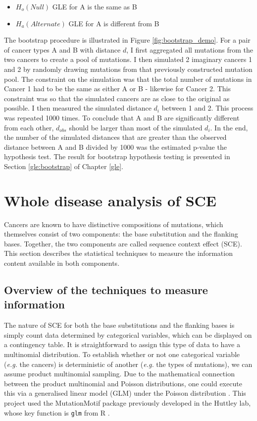 \begin{itemize}
    \item $H_o (Null)$ GLE for A is the same as B
    \item $H_a (Alternate)$ GLE for A is different from B
\end{itemize}

The bootstrap procedure is illustrated in Figure \ref{fig:bootstrap_demo}. For a pair of cancer types A and B with distance $d$, I first aggregated all mutations from the two cancers to create a pool of mutations. I then simulated 2 imaginary cancers 1 and 2 by randomly drawing mutations from that previously constructed mutation pool. The constraint on the simulation was that the total number of mutations in Cancer 1 had to be the same as either A or B - likewise for Cancer 2. This constraint was so that the simulated cancers are as close to the original as possible. I then measured the simulated distance $d_i$ between 1 and 2. This process was repeated 1000 times. To conclude that A and B are significantly different from each other, $d_{obs}$ should be larger than most of the simulated $d_i$. In the end, the number of the simulated distances that are greater than the observed distance between A and B divided by 1000 was the estimated p-value the hypothesis test. The result for bootstrap hypothesis testing is presented in Section \ref{gle:bootstrap} of Chapter \ref{gle}.



\section{Whole disease analysis of SCE}\label{methods:sce}
Cancers are known to have distinctive compositions of mutations, which themselves consist of two components: the base substitution and the flanking bases. Together, the two components are called sequence context effect (SCE). This section describes the statistical techniques  to measure the information content available in both components.

\subsection{Overview of the techniques to measure information}
The nature of SCE for both the base substitutions and the flanking bases is simply count data determined by categorical variables, which can be displayed on a contingency table. It is straightforward to assign this type of data to have a multinomial distribution. To establish whether or not one categorical variable (\textit{e.g.} the cancers) is deterministic of another (\textit{e.g.} the types of mutations), we can assume product multinomial sampling. Due to the mathematical connection between the product multinomial and Poisson distributions, one could execute this  via a generalised linear model (GLM) under the Poisson distribution \citep{Nelder1974LOGSQUARES.}. This project used the MutationMotif package previously developed in the Huttley lab, whose key function is \texttt{glm} from R \citep{Zhu2017}.

